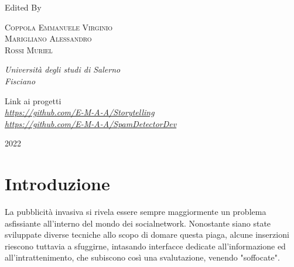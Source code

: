 \documentclass{report}
\begin{document}
\begin{titlepage}
	Edited By
	
	\vspace{0.5\baselineskip} %
	
	{\scshape\large Coppola Emmanuele Virginio \\ Marigliano Alessandro \\ Rossi Muriel \\} %
	
	\vspace{0.5\baselineskip} %
	
	\textit{Università degli studi di Salerno \\ Fisciano} %
	
	
	\vfill %
	
	{\large Link ai progetti\\}
	\textit{ \href{https://github.com/E-M-A-A/Storytelling}{https://github.com/E-M-A-A/Storytelling}\\
	\href{https://github.com/E-M-A-A/SpamDetectorDev}{https://github.com/E-M-A-A/SpamDetectorDev}
	}
	
	
	
	
	\vspace{0.5\baselineskip}
	
	2022 %
	

\end{titlepage}
    \tableofcontents
    \chapter{Introduzione} %
    
    La pubblicità invasiva si rivela essere sempre maggiormente un problema asfissiante all'interno del mondo dei socialnetwork. Nonostante siano state sviluppate diverse tecniche
    allo scopo di domare questa piaga, alcune inserzioni riescono tuttavia a sfuggirne, intasando interfacce dedicate all'informazione ed 
    all'intrattenimento, che subiscono così una svalutazione, venendo "soffocate".
    \newline
\end{document}
